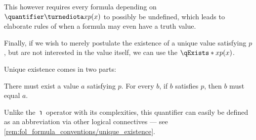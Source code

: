 \begin{concept}
\begin{thmenum}
\begin{thmenum}
      This however requires every formula depending on \( \quantifier \turnediota x p(x) \) to possibly be undefined, which leads to elaborate rules of when a formula may even have a truth value.
    \end{thmenum}

     Finally, if we wish to merely postulate the existence of a unique value satisfying \( p \), but are not interested in the value itself, we can use the  \( \qExists* x p(x) \).

    Unique existence comes in two parts:
    \begin{thmenum}
       There must exist a value \( a \) satisfying \( p \).
       For every \( b \), if \( b \) satisfies \( p \), then \( b \) must equal \( a \).
    \end{thmenum}

    Unlike the \( \turnediota \) operator with its complexities, this quantifier can easily be defined as an abbreviation via other logical connectives --- see \cref{rem:fol_formula_conventions/unique_existence}.
  \end{thmenum}
\end{concept}
